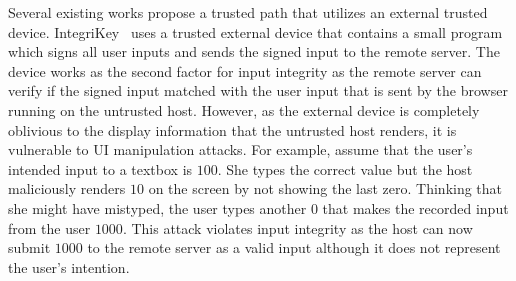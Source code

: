 

 Several existing works propose a trusted path that utilizes an external trusted device. IntegriKey~\cite{IntegriKey} uses a trusted external device that contains a small program which signs all user inputs and sends the signed input to the remote server. The device works as the second factor for input integrity as the remote server can verify if the signed input matched with the user input that is sent by the browser running on the untrusted host. However, as the external device is completely oblivious to the display information that the untrusted host renders, it is vulnerable to UI manipulation attacks. For example, assume that the user's intended input to a textbox is $100$. She types the correct value but the host maliciously renders $10$ on the screen by not showing the last zero. Thinking that she might have mistyped, the user types another $0$ that makes the recorded input from the user $1000$. This attack violates input integrity as the host can now submit $1000$ to the remote server as a valid input although it does not represent the user's intention.

